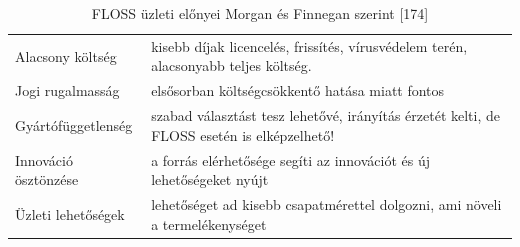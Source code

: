 \documentclass[12pt,magyar,a4paper,oneside]{scrreprt}
\begin{document}
\begin{longtable}[]{@{}ll@{}}
\caption{FLOSS üzleti előnyei Morgan és Finnegan szerint
{[}174{]}}\tabularnewline
\toprule
\endhead
\begin{minipage}[t]{0.19\columnwidth}\raggedright
Alacsony költség\strut
\end{minipage} & \begin{minipage}[t]{0.75\columnwidth}\raggedright
kisebb díjak licencelés, frissítés, vírusvédelem terén, alacsonyabb
teljes költség.\strut
\end{minipage}\tabularnewline
\begin{minipage}[t]{0.19\columnwidth}\raggedright
Jogi rugalmasság\strut
\end{minipage} & \begin{minipage}[t]{0.75\columnwidth}\raggedright
elsősorban költségcsökkentő hatása miatt fontos\strut
\end{minipage}\tabularnewline
\begin{minipage}[t]{0.19\columnwidth}\raggedright
Gyártófüggetlenség\strut
\end{minipage} & \begin{minipage}[t]{0.75\columnwidth}\raggedright
szabad választást tesz lehetővé, irányítás érzetét kelti, de FLOSS
esetén is elképzelhető!\strut
\end{minipage}\tabularnewline
\begin{minipage}[t]{0.19\columnwidth}\raggedright
Innováció ösztönzése\strut
\end{minipage} & \begin{minipage}[t]{0.75\columnwidth}\raggedright
a forrás elérhetősége segíti az innovációt és új lehetőségeket
nyújt\strut
\end{minipage}\tabularnewline
\begin{minipage}[t]{0.19\columnwidth}\raggedright
Üzleti lehetőségek\strut
\end{minipage} & \begin{minipage}[t]{0.75\columnwidth}\raggedright
lehetőséget ad kisebb csapatmérettel dolgozni, ami növeli a
termelékenységet\strut
\end{minipage}\tabularnewline
\bottomrule
\end{longtable}
\end{document}
